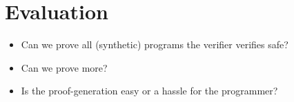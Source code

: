 \section{Evaluation}
\label{sec:Evaluation}
\begin{itemize}
  \item Can we prove all (synthetic) programs the verifier verifies safe?
  \item Can we prove more?  
  \item Is the proof-generation easy or a hassle for the programmer?  
\end{itemize}

